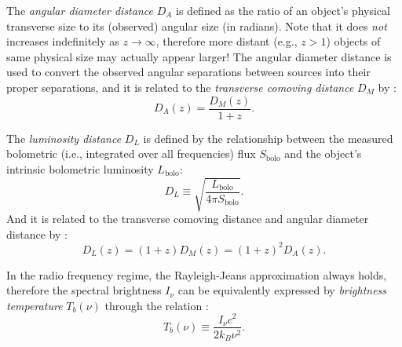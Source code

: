 \documentclass[modern]{aastex61}
\newcommand{\R}[1]{\mathrm{#1}}
\begin{document}
The \emph{angular diameter distance} $D_A$ is defined as the ratio of
an object's physical transverse size to its (observed) angular size
(in radians).  Note that it does \emph{not} increases indefinitely
as $z \to \infty$, therefore more distant (e.g., $z > 1$)
objects of same physical size may actually appear larger!
The angular diameter distance is used to convert the observed angular
separations between sources into their proper separations, and it is
related to the \emph{transverse comoving distance} $D_M$ by
\citep{weinberg1972,peebles1993,hogg1999}:
\begin{equation}
  \label{eq:da-dm}
  D_A(z) = \frac{D_M(z)}{1 + z}.
\end{equation}

The \emph{luminosity distance} $D_L$ is defined by the relationship
between the measured bolometric (i.e., integrated over all frequencies)
flux $S_{\R{bolo}}$ and the object's intrinsic bolometric luminosity
$L_{\R{bolo}}$:
\begin{equation}
  \label{eq:dl-def}
  D_L \equiv \sqrt{\frac{L_{\R{bolo}}}{4\pi S_{\R{bolo}}}}.
\end{equation}
And it is related to the transverse comoving distance and angular
diameter distance by \citep{weinberg1972,hogg1999,ellis2007}:
\begin{equation}
  \label{eq:dl-dm-da}
  D_L(z) = (1+z) D_M(z) = (1+z)^2 D_A(z).
\end{equation}

In the radio frequency regime, the Rayleigh-Jeans approximation
always holds, therefore the spectral brightness $I_{\nu}$ can be
equivalently expressed by \emph{brightness temperature} $T_b(\nu)$
through the relation \citep{condon2016}:
\begin{equation}
  \label{eq:brightness-temp}
  T_b(\nu) \equiv \frac{I_{\nu} c^2}{2 k_B \nu^2}.
\end{equation}





\end{document}

